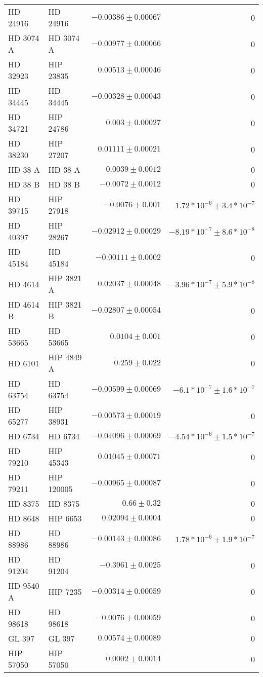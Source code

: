 \begin{longtable*}{llrr}
HD 24916 & HD 24916 & $-0.00386\pm 0.00067$ & 0 \\
HD 3074 A & HD 3074 A & $-0.00977\pm 0.00066$ & 0 \\
HD 32923 & HIP 23835 & $0.00513\pm 0.00046$ & 0 \\
HD 34445 & HD 34445 & $-0.00328\pm 0.00043$ & 0 \\
HD 34721 & HIP 24786 & $0.003\pm 0.00027$ & 0 \\
HD 38230 & HIP 27207 & $0.01111\pm 0.00021$ & 0 \\
HD 38 A & HD 38 A & $0.0039\pm 0.0012$ & 0 \\
HD 38 B & HD 38 B & $-0.0072\pm 0.0012$ & 0 \\
HD 39715 & HIP 27918 & $-0.0076\pm 0.001$ & $1.72*10^{-6}\pm 3.4*10^{-7}$ \\
HD 40397 & HIP 28267 & $-0.02912\pm 0.00029$ & $-8.19*10^{-7}\pm 8.6*10^{-8}$ \\
HD 45184 & HD 45184 & $-0.00111\pm 0.0002$ & 0 \\
HD 4614 & HIP 3821 A & $0.02037\pm 0.00048$ & $-3.96*10^{-7}\pm 5.9*10^{-8}$ \\
HD 4614 B & HIP 3821 B & $-0.02807\pm 0.00054$ & 0 \\
HD 53665 & HD 53665 & $0.0104\pm 0.001$ & 0 \\
HD 6101 & HIP 4849 A & $0.259\pm 0.022$ & 0 \\
HD 63754 & HD 63754 & $-0.00599\pm 0.00069$ & $-6.1*10^{-7}\pm 1.6*10^{-7}$ \\
HD 65277 & HIP 38931 & $-0.00573\pm 0.00019$ & 0 \\
HD 6734 & HD 6734 & $-0.04096\pm 0.00069$ & $-4.54*10^{-6}\pm 1.5*10^{-7}$ \\
HD 79210 & HIP 45343 & $0.01045\pm 0.00071$ & 0 \\
HD 79211 & HIP 120005 & $-0.00965\pm 0.00087$ & 0 \\
HD 8375 & HD 8375 & $0.66\pm 0.32$ & 0 \\
HD 8648 & HIP 6653 & $0.02094\pm 0.0004$ & 0 \\
HD 88986 & HD 88986 & $-0.00143\pm 0.00086$ & $1.78*10^{-6}\pm 1.9*10^{-7}$ \\
HD 91204 & HD 91204 & $-0.3961\pm 0.0025$ & 0 \\
HD 9540 A & HIP 7235 & $-0.00314\pm 0.00059$ & 0 \\
HD 98618 & HD 98618 & $-0.0076\pm 0.00059$ & 0 \\
GL 397 & GL 397 & $0.00574\pm 0.00089$ & 0 \\
HIP 57050 & HIP 57050 & $0.0002\pm 0.0014$ & 0 \\

\end{longtable*}
